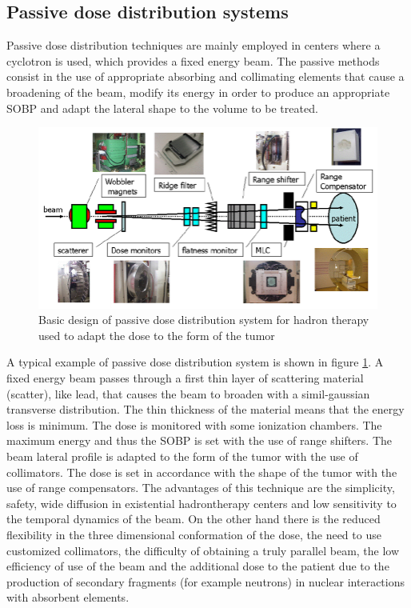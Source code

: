 \subsection{Passive dose distribution systems}
\noindent Passive dose distribution techniques are mainly employed in centers where a cyclotron is used, which provides a fixed energy beam.
The passive methods consist in the use of appropriate absorbing and collimating elements that cause a broadening of the beam, modify its energy in order to produce an appropriate SOBP and adapt the lateral shape to the volume to be treated.
\begin{figure}[H]
	\centering
	\includegraphics[width=0.7\linewidth]{IMG/ch1/Basic-design-of-irradiation-system-for-hadron-therapy}
	\caption{Basic design of passive dose distribution system for hadron therapy used to adapt the dose to the form of the tumor}
	\label{fig:passive}
\end{figure}
\noindent A typical example of passive dose distribution system is shown in figure \ref{fig:passive}. A fixed energy beam passes through a first thin layer of scattering material (scatter), like lead, that causes the beam to broaden with a simil-gaussian transverse distribution.
The thin thickness of the material means that the energy loss is minimum.
The dose is monitored with some ionization chambers.
The maximum energy and thus the SOBP is set with the use of range shifters.
The beam lateral profile is adapted to the form of the tumor with the use of collimators.
The dose is set in accordance with the shape of the tumor with the use of range compensators.
\newline
The advantages of this technique are the simplicity, safety, wide diffusion in existential hadrontherapy centers and low sensitivity to the temporal dynamics of the beam. 
On the other hand there is the reduced flexibility in the three dimensional conformation of the dose, the need to use customized collimators, the difficulty of obtaining a truly parallel beam, the low efficiency of use of the beam and the additional dose to the patient due to the production of secondary fragments (for example neutrons) in nuclear interactions with absorbent elements.


